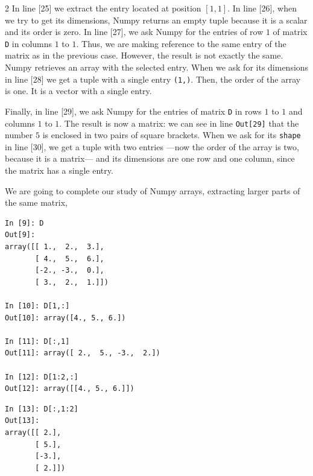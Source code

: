\begin{paracol}{2}
 In line [25] we extract the entry located at position $[1,1]$. In line [26], when we try to get its dimensions, Numpy returns an empty tuple because it is a scalar and its order is zero. In line [27], we ask Numpy for the entries of row $1$ of matrix \texttt{D} in columns $1$ to $1$. Thus, we are making reference to the same entry of the matrix as in the previous case. However, the result is not exactly the same. Numpy retrieves an array with the selected entry. When we ask for its dimensions in line [28] we get a tuple with a single entry \texttt{(1,)}. Then, the order of the array is one. It is a vector with a single entry.

 Finally, in line [29], we ask Numpy for the entries of matrix \texttt{D} in rows $1$ to $1$ and columns $1$ to $1$. The result is now a matrix: we can see in line \texttt{Out[29]} that the number $5$ is enclosed in two pairs of square brackets. When we ask for its \texttt{shape} in line [30], we get a tuple with two entries ---now the order of the array is two, because it is a matrix--- and its dimensions are one row and one column, since the matrix has a single entry.

 We are going to complete our study of Numpy arrays, extracting larger parts of the same matrix, 
 \end{paracol}
\begin{center}
 \begin{minipage}{0.3\textwidth}
    \begin{verbatim}
In [9]: D
Out[9]: 
array([[ 1.,  2.,  3.],
       [ 4.,  5.,  6.],
       [-2., -3.,  0.],
       [ 3.,  2.,  1.]])

In [10]: D[1,:]
Out[10]: array([4., 5., 6.])

In [11]: D[:,1]
Out[11]: array([ 2.,  5., -3.,  2.])
    
In [12]: D[1:2,:]
Out[12]: array([[4., 5., 6.]])
\end{verbatim}
\end{minipage}
\end{center}
\begin{center}
 \begin{minipage}{0.3\textwidth}
    \begin{verbatim}
In [13]: D[:,1:2]
Out[13]: 
array([[ 2.],
       [ 5.],
       [-3.],
       [ 2.]])
    \end{verbatim}
\end{minipage}
\end{center}
